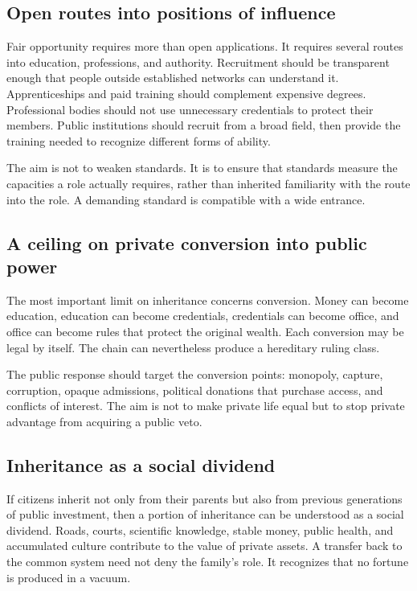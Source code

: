 ﻿\documentclass[12pt,a4paper]{book}
\begin{document}
\subsection{Open routes into positions of influence}

Fair opportunity requires more than open applications.  It requires several
routes into education, professions, and authority.  Recruitment should be
transparent enough that people outside established networks can understand
it.  Apprenticeships and paid training should complement expensive degrees.
Professional bodies should not use unnecessary credentials to protect their
members.  Public institutions should recruit from a broad field, then
provide the training needed to recognize different forms of ability.

The aim is not to weaken standards.  It is to ensure that standards measure
the capacities a role actually requires, rather than inherited familiarity
with the route into the role.  A demanding standard is compatible with a
wide entrance.

\subsection{A ceiling on private conversion into public power}

The most important limit on inheritance concerns conversion.  Money can
become education, education can become credentials, credentials can become
office, and office can become rules that protect the original wealth.  Each
conversion may be legal by itself.  The chain can nevertheless produce a
hereditary ruling class.

The public response should target the conversion points: monopoly, capture,
corruption, opaque admissions, political donations that purchase access,
and conflicts of interest.  The aim is not to make private life equal but to
stop private advantage from acquiring a public veto.

\subsection{Inheritance as a social dividend}

If citizens inherit not only from their parents but also from previous
generations of public investment, then a portion of inheritance can be
understood as a social dividend.  Roads, courts, scientific knowledge,
stable money, public health, and accumulated culture contribute to the value
of private assets.  A transfer back to the common system need not deny the
family's role.  It recognizes that no fortune is produced in a vacuum.
\end{document}

